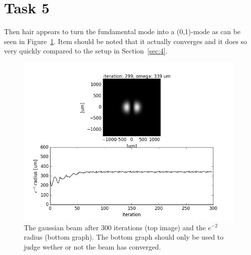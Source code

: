 \documentclass[12pt,a4paper]{article}
\begin{document}
\section{Task 5}\label{sec:5}
Then hair appears to turn the fundamental mode into a (0,1)-mode as can be seen in Figure~\ref{fig:task5}. Item should be noted that it actually converges and it does so very quickly compared to the setup in Section~\ref{sec:4}.
\begin{figure}[ht!]
  \centering
  \includegraphics[width=\textwidth]{5_gauss_1_0.png}
  \caption{The gaussian beam after 300 iterations (top image) and the $e^{-2}$ radius (bottom graph). The bottom graph should only be used to judge wether or not the beam has converged.}
  \label{fig:task5}
\end{figure}
\end{document}

